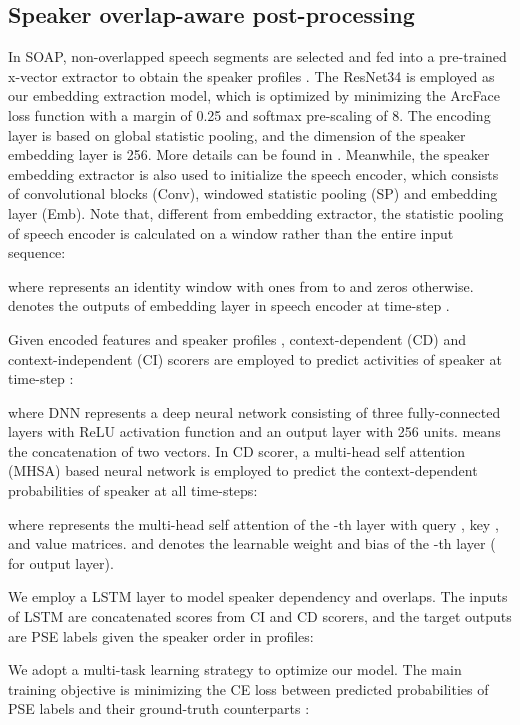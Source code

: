 \documentclass{article}
\begin{document}
\subsection{Speaker overlap-aware post-processing}
In SOAP, non-overlapped speech segments are selected and fed into a pre-trained x-vector extractor to obtain the speaker profiles . The ResNet34 \cite{HeZRS16} is employed as our embedding extraction model, which is optimized by minimizing the ArcFace loss function \cite{DengGXZ19} with a margin of 0.25 and softmax pre-scaling of 8. The encoding layer is based on global statistic pooling, and the dimension of the speaker embedding layer is 256. More details can be found in \cite{EAND}. Meanwhile, the speaker embedding extractor is also used to initialize the speech encoder, which consists of convolutional blocks (Conv), windowed statistic pooling (SP) and embedding layer (Emb).
Note that, different from embedding extractor, the statistic pooling of speech encoder is calculated on a window rather than the entire input sequence:

where  represents an identity window with ones from  to  and zeros otherwise.  denotes the outputs of embedding layer in speech encoder at time-step .


Given encoded features  and speaker profiles , context-dependent (CD) and context-independent (CI) scorers are employed to predict activities of speaker  at time-step :

where DNN represents a deep neural network consisting of three fully-connected layers with ReLU activation function and an output layer with 256 units.  means the concatenation of two vectors.
In CD scorer, a multi-head self attention (MHSA) based neural network is employed to predict the context-dependent probabilities of speaker  at all time-steps:

where  represents the multi-head self attention of the -th layer \cite{self_attention_1} with query , key , and value  matrices.
 and  denotes the learnable weight and bias of the -th layer ( for output layer). 

We employ a LSTM layer to model speaker dependency and overlaps.
The inputs of LSTM are concatenated scores from CI and CD scorers, and the target outputs are PSE labels given the speaker order in profiles:



We adopt a multi-task learning strategy to optimize our model.
The main training objective is minimizing the CE loss between predicted probabilities of PSE labels  and their ground-truth counterparts :
\end{document}
